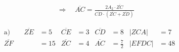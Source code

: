 \begin{exercise}
\begin{equation*}
\begin{split}
        &\quad\Rightarrow\quad
        \overline{AC}=\frac{2A_2\cdot\overline{ZC}}{\overline{CD}\cdot\left(\overline{ZC}+\overline{ZD}\right)}
      \end{split}
    \end{equation*}
  \fi
  \ifoutcome\outcome\par
    \begingroup
      \newcommand{\aZE}{\num{5}}%
      \newcommand{\aZF}{\num{15}}%
      \newcommand{\aDF}{\num{9}}%
      \newcommand{\aZEC}{\num{6}}%
      \newcommand{\aCDBA}{\num{56}}%
      \newcommand{\aCE}{\num{3}}%
      \newcommand{\aZC}{\num{4}}%
      \newcommand{\aZD}{\num{12}}%
      \newcommand{\aCD}{\num{8}}%
      \newcommand{\aAC}{\frac{\num{7}}{\num{2}}}%
      \newcommand{\aBD}{\frac{\num{21}}{\num{2}}}%
      \newcommand{\aZCA}{\num{7}}%
      \newcommand{\aEFDC}{\num{48}}%
      \newcommand{\bZE}{\num{13}}%
      \newcommand{\bZF}{\num{39}}%
      \newcommand{\bDF}{\num{15}}%
      \newcommand{\bZEC}{\num{30}}%
      \newcommand{\bCDBA}{\num{168}}%
      \newcommand{\bCE}{\num{5}}%
      \newcommand{\bZC}{\num{12}}%
      \newcommand{\bZD}{\num{36}}%
      \newcommand{\bCD}{\num{24}}%
      \newcommand{\bAC}{\frac{\num{7}}{\num{2}}}%
      \newcommand{\bBD}{\frac{\num{21}}{\num{2}}}%
      \newcommand{\bZCA}{\num{21}}%
      \newcommand{\bEFDC}{\num{240}}%
      \newcommand{\cZE}{\num{17}}%
      \newcommand{\cZF}{\num{68}}%
      \newcommand{\cDF}{\num{32}}%
      \newcommand{\cZEC}{\num{60}}%
      \newcommand{\cCDBA}{\num{360}}%
      \newcommand{\cCE}{\num{8}}%
      \newcommand{\cZC}{\num{15}}%
      \newcommand{\cZD}{\num{60}}%
      \newcommand{\cCD}{\num{45}}%
      \newcommand{\cAC}{\frac{\num{16}}{\num{5}}}%
      \newcommand{\cBD}{\frac{\num{64}}{\num{5}}}%
      \newcommand{\cZCA}{\num{24}}%
      \newcommand{\cEFDC}{\num{900}}%
      \newcommand{\dZE}{\num{53}}%
      \newcommand{\dZF}{\num{212}}%
      \newcommand{\dDF}{\num{180}}%
      \newcommand{\dZEC}{\num{630}}%
      \newcommand{\dCDBA}{\num{420}}%
      \newcommand{\dCE}{\num{45}}%
      \newcommand{\dZC}{\num{28}}%
      \newcommand{\dZD}{\num{112}}%
      \newcommand{\dCD}{\num{84}}%
      \newcommand{\dAC}{\num{2}}%
      \newcommand{\dBD}{\num{8}}%
      \newcommand{\dZCA}{\num{28}}%
      \newcommand{\dEFDC}{\num{9450}}%
      \begin{align*}
        \text{a)}\qquad\overline{ZE}&=\aZE   & \overline{CE}&=\aCE & \overline{CD}&=\aCD &  |ZCA|&=\aZCA  \\
                       \overline{ZF}&=\aZF   & \overline{ZC}&=\aZC & \overline{AC}&=\aAC & |EFDC|&=\aEFDC \\

\end{align*}
\end{exercise}
